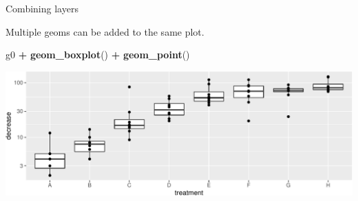 \documentclass[
  ignorenonframetext,
]{beamer}
\newenvironment{Shaded}{\begin{snugshade}}{\end{snugshade}}
\newcommand{\KeywordTok}[1]{\textcolor[rgb]{0.13,0.29,0.53}{\textbf{#1}}}
\newcommand{\NormalTok}[1]{#1}
\newcommand{\OperatorTok}[1]{\textcolor[rgb]{0.81,0.36,0.00}{\textbf{#1}}}
\newcommand{\StringTok}[1]{\textcolor[rgb]{0.31,0.60,0.02}{#1}}
\begin{document}
\begin{frame}[fragile]{Combining layers}
\protect\hypertarget{combining-layers}{}

Multiple geoms can be added to the same plot.

\scriptsize

\begin{Shaded}
\begin{Highlighting}[]
\NormalTok{g0 }\OperatorTok{+}\StringTok{ }\KeywordTok{geom_boxplot}\NormalTok{() }\OperatorTok{+}\StringTok{ }\KeywordTok{geom_point}\NormalTok{() }
\end{Highlighting}
\end{Shaded}

\includegraphics{data_viz_files/figure-beamer/unnamed-chunk-11-1.pdf}

\end{frame}
\end{document}
